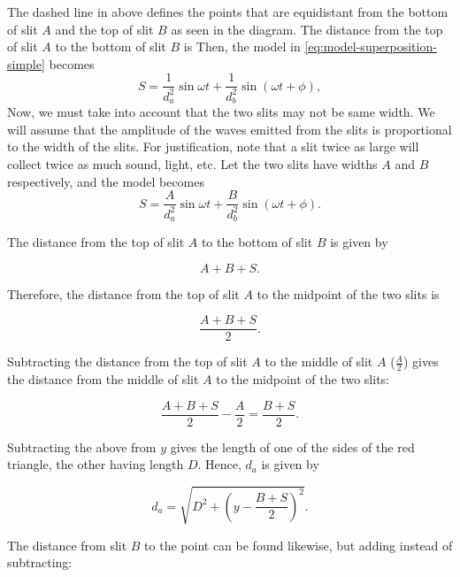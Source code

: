 \documentclass{paper}
\newcommand{\daformula}[0]{\sqrt{D^2 + \left(y - \frac{B + S}{2}\right)^2}}
\begin{document}
The dashed line in  above
defines the points that are equidistant from the bottom of slit $A$ and the top of slit $B$
as seen in the diagram. The distance from the top of slit $A$ to the bottom of slit $B$ is
Then, the model in \eqref{eq:model-superposition-simple}
becomes 
\begin{equation}
    S = \frac{1}{d_{a}^{2}}\sin{\omega{}t} + \frac{1}{d_{b}^{2}}\sin(\omega{}t + \phi),
\end{equation}
Now, we must take into account that the two slits may not be same width. We will
assume that the amplitude of the waves emitted from the slits is proportional to the width of the slits.
For justification, note that a slit twice as large will collect twice as much sound, light, etc.
Let the two slits have widths $A$ and $B$ respectively, and the model becomes
\begin{equation}
    S = \frac{A}{d_{a}^{2}}\sin{\omega{}t} + \frac{B}{d_{b}^{2}}\sin(\omega{}t + \phi).
\end{equation}

The distance from the top of slit $A$ to the bottom of slit $B$ is given by

\begin{equation*}
    A + B + S.
\end{equation*}

Therefore, the distance from the top of slit $A$ to the midpoint of the two slits is

\begin{equation}
\label{eq:distance-from-slit-A-to-midpoint}
    \frac{A + B + S}{2}.
\end{equation}

Subtracting the distance from the top of slit $A$ to the middle of slit $A$ ($\frac{A}{2}$)
gives the distance from the middle of slit $A$ to the midpoint of the two slits:

\begin{equation*}
    \frac{A + B + S}{2} - \frac{A}{2} = \frac{B + S}{2}.
\end{equation*}

Subtracting the above from $y$ gives the length of one of the sides of the red triangle, the other
having length $D$. Hence, $d_a$ is given by 

\begin{equation}
    \label{eq:d_a}
    d_a = \daformula.
\end{equation}

The distance from slit $B$ to the point can be found likewise, but adding instead of subtracting:
            
\end{document}
